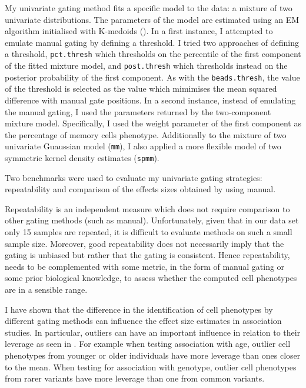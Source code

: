 My  univariate gating method fits a specific model to the data: a mixture of two univariate distributions.
The parameters of the model are estimated using an \Gls{EM} algorithm \citep{Dempster:1977ul} initialised with K-medoids ().
In a first instance, I attempted to emulate manual gating by defining a threshold.
I tried two approaches of defining a threshold, \texttt{pct.thresh} which thresholds on the percentile of the first component of the fitted mixture model,
and \texttt{post.thresh} which thresholds instead on the posterior probability of the first component.
As with the \texttt{beads.thresh}, the value of the threshold is selected as the value which mimimises the mean squared difference with manual gate positions.
In a second instance, instead of emulating the manual gating, I used the parameters returned by the two-component mixture model.
Specifically, I used the weight parameter of the first component as the percentage of memory cells phenotype.
Additionally to the mixture of two univariate Guaussian model (\texttt{mm}), I also applied a more flexible model of two symmetric kernel density estimates
(\texttt{spmm}).

Two benchmarks were used to evaluate my univariate gating strategies: repeatability and comparison of the effects sizes obtained 
by \citet{Dendrou:2009dv} using manual.

Repeatability is an independent measure which does not require comparison to other gating methods (such as manual).
Unfortunately, given that in our data set only 15 samples are repeated, it is difficult to evaluate methods on such a small sample size.
Moreover, good repeatability does not necessarily imply that the gating is unbiased but rather that the gating is consistent.
Hence repeatability, needs to be complemented with some metric, in the form of manual gating or some prior biological knowledge,
to assess whether the computed cell phenotypes are in a sensible range.

I have shown that the difference in the identification of cell phenotypes by different gating methods can influence the effect size estimates in association studies.
In particular, outliers can have an important influence in relation to their leverage as seen in .
For example when testing association with age, outlier cell phenotypes from younger or older individuals have more leverage than ones closer to the mean.
When testing for association with genotype, outlier cell phenotypes from rarer variants have more leverage than one from common variants.

